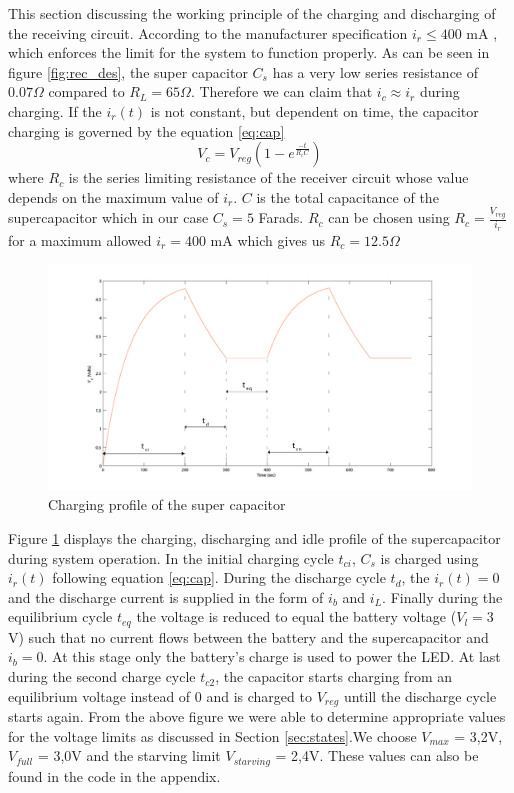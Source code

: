 This section discussing the working principle of the charging and discharging of the receiving circuit. According to the manufacturer specification $i_r \leq 400 $ mA , which enforces the limit for the system to function properly.
As can be seen in figure \ref{fig:rec_des}, the super capacitor $C_s$ has a very low series resistance of $0.07 \Omega$ compared to $R_L = 65 \Omega$. Therefore we can claim that $i_c \approx i_r$ during charging. If the $i_r(t)$ is not constant, but dependent on time, the capacitor charging is governed by the equation \ref{eq:cap}
\begin{equation}\label{eq:cap}
 V_c = V_{reg} \left(1 - e^{\frac{-t}{R_cC}}\right)
\end{equation}
where $R_c$ is the series limiting resistance of the receiver circuit whose value depends on the maximum value of $i_r$. $C$ is the total capacitance of the supercapacitor which in our case $C_s = 5 $ Farads. $R_c$ can be chosen using $R_c = \frac { V_{reg}}{i_r} $ for a maximum allowed $i_r = 400$ mA which gives us $R_c = 12.5 \Omega$

\begin{figure}[h!]
\centering
\includegraphics[width=1\textwidth]{cd_cycle.pdf}
\caption{Charging profile of the super capacitor }
\label{fig:ch_profile}
\end{figure}

Figure \ref{fig:ch_profile} displays the charging, discharging and idle profile of the supercapacitor during system operation. In the initial charging cycle $t_{ci}$, $C_s$ is charged using $i_r(t)$ following equation \ref{eq:cap}. During the discharge cycle $t_d$, the $i_r(t) = 0$ and the discharge current is supplied in the form of $i_b$ and $i_L$. Finally during the equilibrium cycle $t_{eq}$ the voltage is reduced to equal the battery voltage ($V_l = 3$ V) such that no current flows between the battery and the supercapacitor and $i_b = 0$. At this stage only the battery's charge is used to power the LED. At last during the second charge cycle $t_{c2}$, the capacitor starts charging from an equilibrium voltage instead of 0 and is charged to $V_{reg}$ untill the discharge cycle starts again. From the above figure we were able to determine appropriate values for the voltage limits as discussed in Section \ref{sec:states}.We choose $V_{max}$ = 3,2V, $V_{full}$ = 3,0V and the starving limit $V_{starving}$ = 2,4V. These values can also be found in the code in the appendix. 
